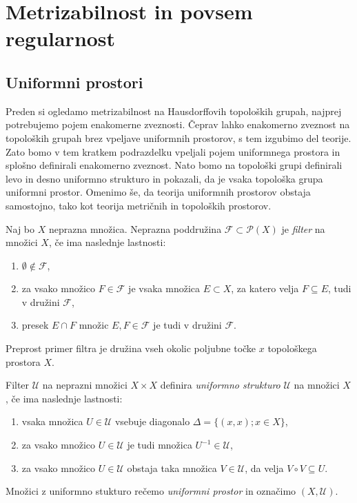 \documentclass[mat1]{fmfdelo}
\newcommand{\Ucurl}{\mathcal{U}}
\begin{document}
\section{Metrizabilnost in povsem regularnost}
\subsection{Uniformni prostori}
Preden si ogledamo metrizabilnost na Hausdorffovih topoloških grupah, najprej potrebujemo pojem enakomerne zveznosti. Čeprav lahko enakomerno zveznost na topoloških grupah brez vpeljave uniformnih prostorov, s tem izgubimo del teorije. Zato bomo v tem kratkem podrazdelku vpeljali pojem uniformnega prostora in splošno definirali enakomerno zveznost. Nato bomo na topološki grupi definirali levo in desno uniformno strukturo in pokazali, da je vsaka topološka grupa uniformni prostor. Omenimo še, da teorija uniformnih prostorov obstaja samostojno, tako kot teorija metričnih in topoloških prostorov.
\begin{definicija}\label{def:uniform}
Naj bo $X$ neprazna množica. Neprazna poddružina $\mathcal{F} \subset \mathcal{P}(X)$ je \emph{filter} na množici $X$, če ima naslednje lastnosti:
\begin{enumerate}
\item $\emptyset \notin \mathcal{F}$,
\item za vsako množico $F \in \mathcal{F}$ je vsaka množica $E \subset X$, za katero velja $F \subseteq E$, tudi v družini $\mathcal{F}$,
\item presek $E \cap F$ množic $E, F \in \mathcal{F}$ je tudi v družini $\mathcal{F}$.
\end{enumerate}
\end{definicija}

\begin{primer}
Preprost primer filtra je družina vseh okolic poljubne točke $x$ topološkega prostora $X$. 
\end{primer}
\begin{definicija}
Filter $\mathcal{U}$ na neprazni množici $X \times X$ definira \emph{uniformno strukturo} $\Ucurl$ na množici $X$, če ima naslednje lastnosti:
\begin{enumerate}
\item vsaka množica $U \in \mathcal{U}$ vsebuje diagonalo $\Delta = \lbrace (x, x) ; x \in X \rbrace$,
\item za vsako množico $U \in \mathcal{U}$ je tudi množica $U^{-1} \in \mathcal{U}$,
\item za vsako množico $U \in \mathcal{U}$ obstaja taka množica $V \in \mathcal{U}$, da velja $V \circ V \subseteq U$.
\end{enumerate}
Množici z uniformno stukturo rečemo \emph{uniformni prostor} in označimo $(X, \Ucurl)$.
\end{definicija}
\end{document}
